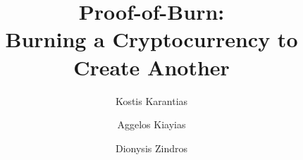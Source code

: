 \title{
Proof-of-Burn:\\ Burning a Cryptocurrency to Create Another
}

\ifanonymous
   \author{}
   \institute{}
\else
   \author{
           Kostis Karantias  \and
           Aggelos Kiayias  \and
           Dionysis Zindros 
   }
\fi
\maketitle
